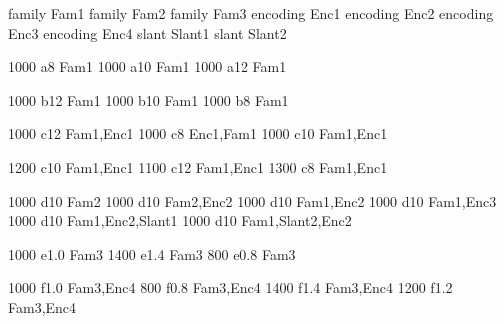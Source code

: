 


\newfontattr family     Fam1
\newfontattr family     Fam2
\newfontattr family     Fam3
\newfontattr encoding   Enc1
\newfontattr encoding   Enc2
\newfontattr encoding   Enc3
\newfontattr encoding   Enc4
\newfontattr slant      Slant1
\newfontattr slant      Slant2


  1000 a8  Fam1
 1000 a10 Fam1
 1000 a12 Fam1

 1000 b12 Fam1
 1000 b10 Fam1
  1000 b8  Fam1


 1000 c12 Fam1,Enc1
  1000 c8  Enc1,Fam1
 1000 c10 Fam1,Enc1

 1200 c10 Fam1,Enc1
 1100 c12 Fam1,Enc1
  1300 c8  Fam1,Enc1


 1000 d10 Fam2
 1000 d10 Fam2,Enc2
 1000 d10 Fam1,Enc2
 1000 d10 Fam1,Enc3
 1000 d10 Fam1,Enc2,Slant1
 1000 d10 Fam1,Slant2,Enc2


 1000 e1.0 Fam3
 1400 e1.4 Fam3
 800  e0.8 Fam3

 1000 f1.0 Fam3,Enc4
 800  f0.8 Fam3,Enc4
 1400 f1.4 Fam3,Enc4
 1200 f1.2 Fam3,Enc4

\bye
